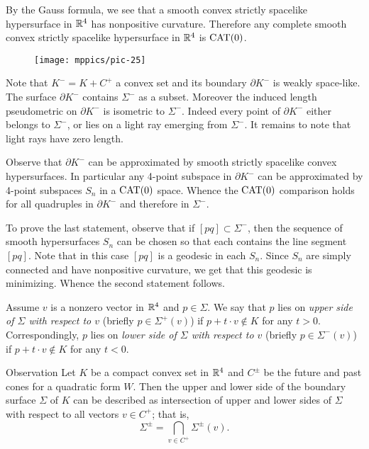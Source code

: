 \documentclass{article}
\begin{document}
By the Gauss formula, we see that a smooth convex strictly spacelike hypersurface in $\mathbb{R}^4$ has nonpositive curvature.
Therefore any complete smooth convex strictly spacelike hypersurface in $\mathbb{R}^4$ is $\mathrm{CAT}(0)$.

\begin{wrapfigure}{r}{55mm}
\vskip-0mm
\centering
\texttt{[image: mppics/pic-25]}
\end{wrapfigure}

Note that $K^-=K+C^+$ a convex set and its boundary $\partial K^-$ is weakly space-like.
The surface $\partial K^-$ contains $\Sigma^-$ as a subset.
Moreover the induced length pseudometric on $\partial K^-$ is isometric to $\Sigma^-$.
Indeed every point of $\partial K^-$ either belongs to  $\Sigma^-$, or lies on a light ray emerging from $\Sigma^-$.
It remains to note that light rays have zero length.

Observe that $\partial K^-$ can be approximated by smooth strictly spacelike convex hypersurfaces.
In particular any 4-point subspace in $\partial K^-$ can be approximated by 4-point subspaces $S_n$ in a $\mathrm{CAT}(0)$ space.
Whence the $\mathrm{CAT}(0)$ comparison holds for all quadruples in $\partial K^-$ and therefore in $\Sigma^-$.

To prove the last statement, observe that if $[pq]\subset \Sigma^-$,
then the sequence of smooth hypersurfaces $S_n$ can be chosen so that each contains the line segment $[pq]$.
Note that in this case $[pq]$ is a geodesic in each $S_n$.
Since $S_n$ are simply connected and have nonpositive curvature, we get that this geodesic is minimizing.
Whence the second statement follows.
\qeds




Assume $v$ is a nonzero vector in $\mathbb{R}^4$ and $p\in\Sigma$.
We say that $p$ lies on \emph{upper side of $\Sigma$ with respect to $v$} (briefly $p\in \Sigma^+(v)$) if $p+t\cdot v\notin K$ for any $t>0$.
Correspondingly, $p$ lies on \emph{lower side of $\Sigma$ with respect to $v$} (briefly $p\in \Sigma^-(v)$) if $p+t\cdot v\notin K$ for any $t<0$.

\begin{thm}{Observation}\label{obs:Sigma(v)}
Let $K$ be a compact convex set in $\mathbb{R}^4$ and $C^\pm$ be the future and past cones for a quadratic form $W$.
Then the upper and lower side of the boundary surface $\Sigma$ of $K$ can be described as intersection of upper and lower sides of $\Sigma$ with respect to all vectors $v\in C^+$;
that is,
\[\Sigma^\pm=\bigcap_{v\in C^+}\Sigma^\pm(v).\]
\end{thm}
\end{document}
